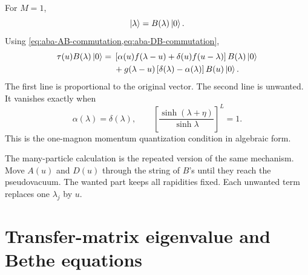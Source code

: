 \begin{example}
For $M=1$,
\begin{equation}
    \left|\lambda\right\rangle=B(\lambda)\left|0\right\rangle .
\end{equation}
Using \cref{eq:aba-AB-commutation,eq:aba-DB-commutation},
\begin{equation}
\label{eq:aba-one-particle-action}
\begin{aligned}
    \tau(u)B(\lambda)\left|0\right\rangle
    ={}&
    \left[
        \alpha(u)f(\lambda-u)+\delta(u)f(u-\lambda)
    \right]B(\lambda)\left|0\right\rangle
    \\
    &
    +g(\lambda-u)
    \left[
        \delta(\lambda)-\alpha(\lambda)
    \right]B(u)\left|0\right\rangle .
\end{aligned}
\end{equation}
The first line is proportional to the original vector.  The second line is
unwanted.  It vanishes exactly when
\begin{equation}
\label{eq:aba-one-particle-bethe-equation}
    \alpha(\lambda)=\delta(\lambda),
    \qquad
    \left[\frac{\sinh(\lambda+\eta)}{\sinh\lambda}\right]^L=1 .
\end{equation}
This is the one-magnon momentum quantization condition in algebraic form.
\end{example}

The many-particle calculation is the repeated version of the same mechanism.
Move $A(u)$ and $D(u)$ through the string of $B$'s until they reach the
pseudovacuum.  The wanted part keeps all rapidities fixed.  Each unwanted term
replaces one $\lambda_j$ by $u$.

\section{Transfer-matrix eigenvalue and Bethe equations}
\label{sec:aba-transfer-eigenvalue-bethe-equations}

